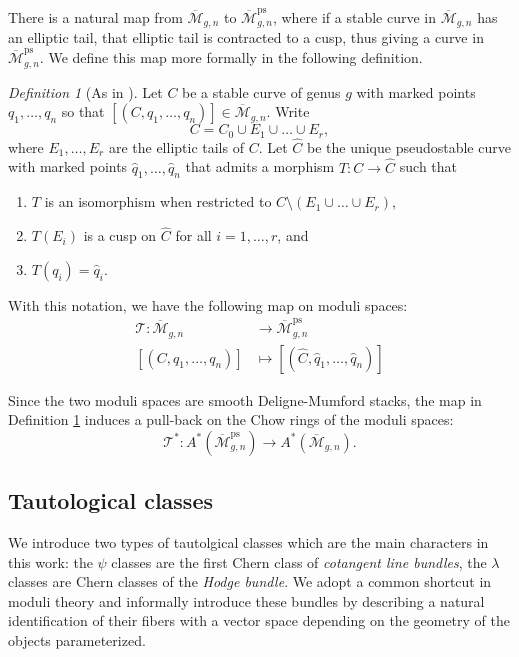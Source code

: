 \documentclass[leqno,12pt]{amsart}
\theoremstyle{remark}
\newtheorem{definition}[theorem]{Definition}
\numberwithin{equation}{section}
\DeclareMathOperator{\ps}{ps}
\begin{document}
There is a natural map from $\overline{\mathcal{M}}_{g, n}$ to $\overline{\mathcal{M}}^{\ps}_{g, n}$, where if a stable curve in $\overline{\mathcal{M}}_{g, n}$ has an elliptic tail, that elliptic tail is contracted to a cusp, thus giving a curve in $\overline{\mathcal{M}}^{\ps}_{g, n}$. We define this map more formally in the following definition.

\begin{definition} [As in \cite{PSHI}] \label{Tdef}
    Let $C$ be a stable curve of genus $g$ with marked points $q_1, \dots, q_n$ so that $[(C, q_1, \dots, q_n)] \in \overline{\mathcal{M}}_{g, n}$. Write $$C = C_0 \cup E_1 \cup \dots \cup E_r,$$ where $E_1, \dots, E_r$ are the elliptic tails of $C$. Let $\hat{C}$ be the unique pseudostable curve with marked points $\hat{q}_1, \dots, \hat{q}_n$ that admits a morphism $T: C \rightarrow \hat{C}$ such that 
    \begin{enumerate}
        \item $T$ is an isomorphism when restricted to $C \setminus (E_1 \cup \dots \cup E_r)$,
        \item $T(E_i)$ is a cusp on $\hat{C}$ for all $i = 1, \dots, r$, and
        \item $T(q_i) = \hat{q}_i$.
    \end{enumerate}
    With this notation, we have the following map on moduli spaces:
    \begin{align*}
        \mathcal{T}: \overline{\mathcal{M}}_{g, n} &\rightarrow \overline{\mathcal{M}}^{\ps}_{g, n}\\
        [(C, q_1, \dots, q_n)] &\mapsto [(\hat{C}, \hat{q}_1, \dots, \hat{q}_n)]
    \end{align*}
\end{definition}
Since the two moduli spaces are smooth Deligne-Mumford stacks, the map in Definition \ref{Tdef} induces a pull-back on the Chow rings of the moduli spaces:
$$
\mathcal{T}^\ast: A^\ast(\overline{\mathcal{M}}^{\ps}_{g, n}) \rightarrow A^\ast(\overline{\mathcal{M}}_{g, n}).
$$
\subsection{Tautological classes}

We introduce two types of tautolgical classes which are the main characters in this work: the $\psi$ classes are the first Chern class of
{\it cotangent line bundles}, the $\lambda$ classes are Chern classes of the {\it Hodge bundle}. We adopt a common shortcut in moduli theory and informally introduce these bundles by describing a natural identification of their fibers with a vector space depending on the geometry of the objects parameterized.
\end{document}
